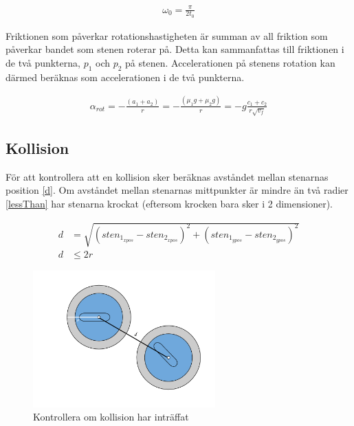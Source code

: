 \documentclass[11pt]{article} %
\begin{document}
\begin{align}\label{vinkelhastighet}
 \omega_0 = \frac{\pi}{2 t_0} 
 \end{align}


Friktionen som påverkar rotationshastigheten är summan av all friktion som påverkar bandet som stenen roterar på. Detta kan sammanfattas till friktionen i de två punkterna, $p_1$ och $p_2$ på stenen. Accelerationen på stenens rotation kan därmed beräknas som accelerationen i de två punkterna. 

 \begin{align}\label{a_rotation1}
 \alpha_{rot} =- \frac{( a_1 + a_2)}{r} = -\frac{(\mu_1 g + \mu_2 g)}{r} = - g\frac{c_1+c_2}{r \sqrt{v_f}}
 \end{align}
 
\pagebreak
\subsection{Kollision}

För att kontrollera att en kollision sker beräknas avståndet mellan stenarnas position \eqref{d}.
Om avståndet mellan stenarnas mittpunkter är mindre än två radier \eqref{lessThan} har stenarna krockat  (eftersom krocken bara sker i 2 dimensioner). 

 \begin{subequations}\label{d}
 \begin{align}
 d& = \sqrt{(sten_{1_{xpos}} - sten_{2_{xpos}})^2   +   (sten_{1_{ypos}}-sten_{2_{ypos}})^2}\\\label{lessThan}
 d& \le 2 r
 \end{align}
 \end{subequations}

\begin{figure}[ht!]
\centering
\includegraphics[width=70mm]{krock.png}
\caption{Kontrollera om kollision har inträffat}
\label{fig:kollision}
\label{overflow}
\end{figure}
\end{document}
